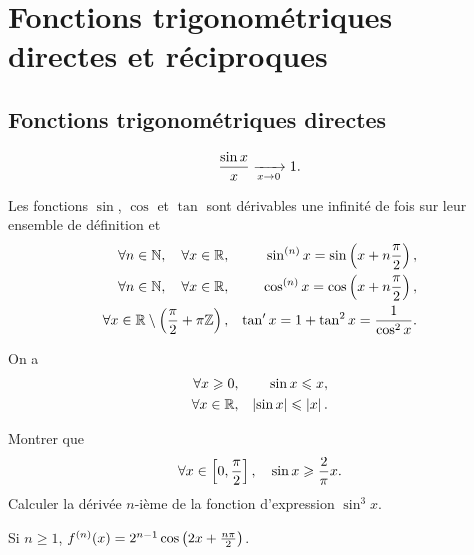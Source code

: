 \documentclass{magnoliaold}
\begin{document}
\section{Fonctions trigonométriques directes et réciproques}
\subsection{Fonctions trigonométriques directes}

\begin{proposition}
  \[\frac{\sin x}{x}\xrightarrow[x\rightarrow 0]{}1.\]
\end{proposition}

\begin{proposition}[utile=-3]
Les fonctions $\sin$, $\cos$ et $\tan$ sont dérivables une infinité de fois sur leur ensemble
de définition et
\begin{eqnarray*}
\forall n\in\mathbb{N} ,\quad \forall x\in\mathbb{R}, & &
  \sin^{(n)} x=\sin\left(x+n\frac{\pi}{2}\right),\\
\forall n\in\mathbb{N} ,\quad \forall x\in\mathbb{R}, & &
  \cos^{(n)} x=\cos\left(x+n\frac{\pi}{2}\right),\\
\forall x\in\mathbb{R}\setminus\left(\frac{\pi}{2}+\pi\mathbb{Z}\right), & &
  \tan' x=1+\tan^2 x=\frac{1}{\cos^2 x}.
\end{eqnarray*}
\end{proposition}

\begin{proposition}
On a
\begin{eqnarray*}
\forall x\geqslant 0,& & \sin x\leqslant x,\\
\forall x\in\mathbb{R},& & \left|\sin x\right|\leqslant \left|x\right|.
\end{eqnarray*}
\end{proposition}

\begin{exos}
\exemple Montrer que
  \[\forall x\in\left[0,\frac{\pi}{2}\right] ,\quad
    \sin x \geqslant \frac{2}{\pi}x.\]
\exemple Calculer la dérivée $n$-ième de la fonction d'expression $\sin^3 x$.
  \begin{sol}
  Si $n\geq 1$, $f^{(n)}(x)=2^{n-1}\cos\left(2x+\frac{n\pi}{2}\right)$.
  \end{sol}
\end{exos}

\end{document}
